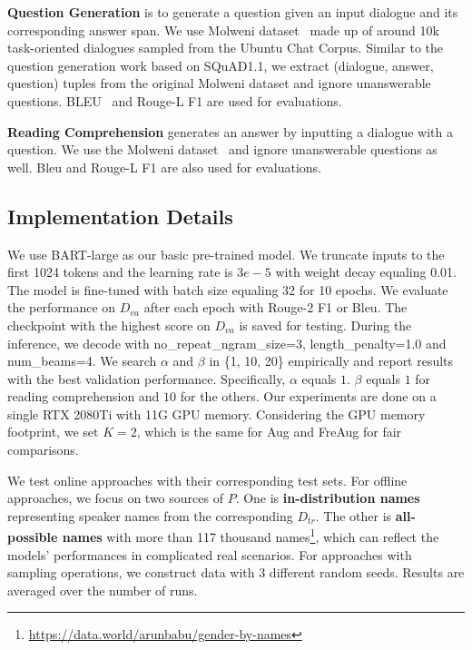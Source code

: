 \textbf{Question Generation} is to generate a question given an input dialogue and its corresponding answer span. We use Molweni dataset~\cite{li2020molweni} made up of around 10k task-oriented dialogues sampled from the Ubuntu Chat Corpus.
Similar to the question generation work based on SQuAD1.1, we extract (dialogue, answer, question) tuples from the original Molweni dataset and ignore unanswerable questions. BLEU~\cite{papineni2002bleu} and Rouge-L F1 are used for evaluations. %

\textbf{Reading Comprehension} generates an answer by inputting a dialogue with a question. We use the Molweni dataset~\cite{li2020molweni} and ignore unanswerable questions as well. Bleu and Rouge-L F1 are also used for evaluations.








\subsection{Implementation Details}

We use BART-large
as our basic pre-trained model. We truncate inputs to the first 1024 tokens and the learning rate is $3e-5$ with weight decay equaling 0.01. The model is fine-tuned with batch size equaling 32 for 10 epochs. We evaluate the performance on $D_{va}$ after each epoch with Rouge-2 F1 or Bleu. The checkpoint with the highest score on $D_{va}$ is saved for testing. During the inference, we decode with no\_repeat\_ngram\_size=3, length\_penalty=1.0 and num\_beams=4. We search $\alpha$ and $\beta$ in \{1, 10, 20\} empirically and report results with the best validation performance. Specifically, $\alpha$ equals $1$. $\beta$ equals $1$ for reading comprehension and $10$ for the others.
Our experiments are done on a single RTX 2080Ti with 11G GPU memory.
Considering the GPU memory footprint, we set $K=2$, which is the same for Aug and FreAug for fair comparisons. %

We test online approaches with their corresponding test sets. For offline approaches, we focus on two sources of $P$. One is \textbf{in-distribution names} representing speaker names from the corresponding $D_{tr}$. The other is \textbf{all-possible names} with more than 117 thousand names\footnote{\url{https://data.world/arunbabu/gender-by-names}}, which can reflect the models' performances in complicated real scenarios. 
For approaches with sampling operations, we construct data with 3 different random seeds. Results are averaged over the number of runs.


